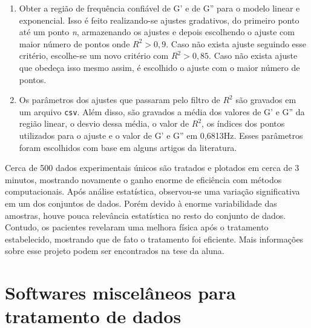 \begin{apendicesenv}
\begin{enumerate}
	\item Obter a região de frequência confiável de G' e de G'' para o modelo linear e exponencial. Isso é feito realizando-se ajustes gradativos, do primeiro ponto até um ponto \emph{n}, armazenando os ajustes e depois escolhendo o ajuste com maior número de pontos onde $R^2 > 0,9$. Caso não exista ajuste seguindo esse critério, escolhe-se um novo critério com $R^2 > 0,85$. Caso não exista ajuste que obedeça isso mesmo assim, é escolhido o ajuste com o maior número de pontos. 
	\item Os parâmetros dos ajustes que passaram pelo filtro de $R^2$ são gravados em um arquivo \texttt{csv}. Além disso, são gravados a média dos valores de G' e G'' da região linear, o desvio dessa média, o valor de $R^2$, os índices dos pontos utilizados para o ajuste e o valor de G' e G'' em 0,6813Hz. Esses parâmetros foram escolhidos com base em alguns artigos da literatura. %
\end{enumerate}

Cerca de 500 dados experimentais únicos são tratados e plotados em cerca de 3 minutos, mostrando novamente o ganho enorme de eficiência com métodos computacionais. Após análise estatística, observou-se uma variação significativa em um dos conjuntos de dados. Porém devido à enorme variabilidade das amostras, houve pouca relevância estatística no resto do conjunto de dados. Contudo, os pacientes revelaram uma melhora física após o tratamento estabelecido, mostrando que de fato o tratamento foi eficiente. Mais informações sobre esse projeto podem ser encontrados na tese da aluna. %

\section{Softwares miscelâneos para tratamento de dados}


\end{apendicesenv}

%
%
%
%
%
%
%
